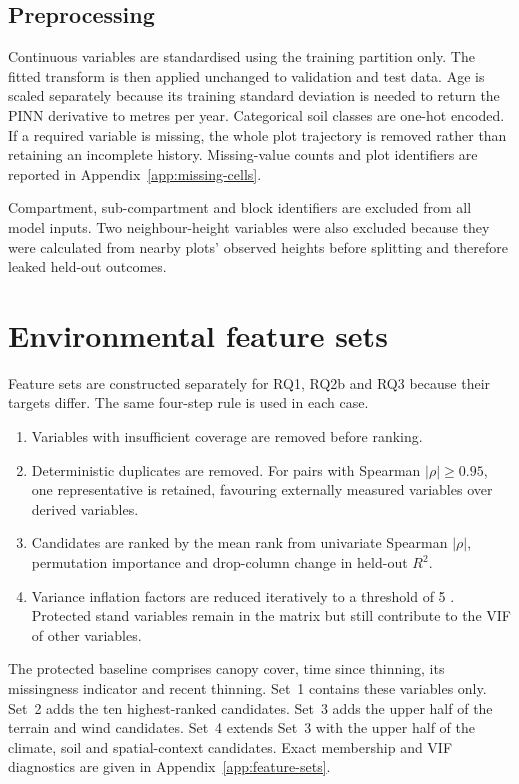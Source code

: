 \subsection{Preprocessing}

Continuous variables are standardised using the training partition only. The fitted transform is
then applied unchanged to validation and test data. Age is scaled separately because its training
standard deviation is needed to return the PINN derivative to metres per year. Categorical soil
classes are one-hot encoded. If a required variable is missing, the whole plot trajectory is
removed rather than retaining an incomplete history. Missing-value counts and plot identifiers
are reported in Appendix~\ref{app:missing-cells}.

Compartment, sub-compartment and block identifiers are excluded from all model inputs. Two
neighbour-height variables were also excluded because they were calculated from nearby plots'
observed heights before splitting and therefore leaked held-out outcomes.

\section{Environmental feature sets}
\label{sec:feature-sets}

Feature sets are constructed separately for RQ1, RQ2b and RQ3 because their targets differ. The
same four-step rule is used in each case.

\begin{enumerate}
\setlength\itemsep{0pt}
\item Variables with insufficient coverage are removed before ranking.
\item Deterministic duplicates are removed. For pairs with Spearman $|\rho|\geq0.95$, one
representative is retained, favouring externally measured variables over derived variables.
\item Candidates are ranked by the mean rank from univariate Spearman $|\rho|$, permutation
importance and drop-column change in held-out $R^2$.
\item Variance inflation factors are reduced iteratively to a threshold of 5
\citep{obrien2007Caution_C5_EVAL}. Protected stand variables remain in the matrix but still
contribute to the VIF of other variables.
\end{enumerate}

The protected baseline comprises canopy cover, time since thinning, its missingness indicator and
recent thinning. Set~1 contains these variables only. Set~2 adds the ten highest-ranked candidates.
Set~3 adds the upper half of the terrain and wind candidates. Set~4 extends Set~3 with the upper
half of the climate, soil and spatial-context candidates. Exact membership and VIF diagnostics are
given in Appendix~\ref{app:feature-sets}.

